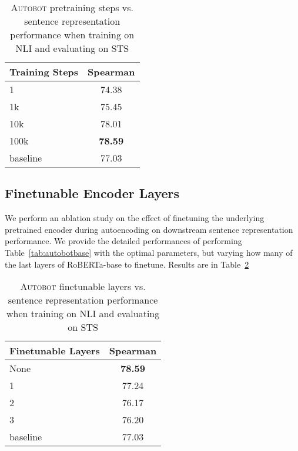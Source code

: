\begin{table}[ht!]
	\centering 
	\footnotesize
	\begin{tabular}{ l | c }
		\toprule
		\textbf{Training Steps} & \textbf{Spearman} \\ \midrule
		1 & 74.38 \\
		1k & 75.45 \\
		10k & 78.01 \\
		100k & \textbf{78.59}  \\
		\hline
		baseline & 77.03 \\
        \bottomrule
	\end{tabular}
	\caption{\label{tab:autosteps}\textsc{Autobot} pretraining steps vs. sentence representation performance when training on NLI and evaluating on STS}
	
\end{table}


\subsection{Finetunable Encoder Layers}\label{adx:finetune}
We perform an ablation study on the effect of finetuning the underlying pretrained encoder during autoencoding on downstream sentence representation performance. We provide the detailed performances of performing Table~\ref{tab:autobotbase} with the optimal parameters, but varying how many of the last layers of RoBERTa-base to finetune. Results are in Table~\ref{tab:finetune}

\begin{table}[ht!]
	\centering 
	\footnotesize

	\begin{tabular}{ l | c }
		\toprule
		\textbf{Finetunable Layers} & \textbf{Spearman} \\ \midrule
		None & \textbf{78.59} \\
		1 & 77.24 \\
		2 & 76.17 \\
		3 & 76.20 \\
		\hline
		baseline & 77.03 \\
        \bottomrule
	\end{tabular}
	\caption{\label{tab:finetune} \textsc{Autobot} finetunable layers vs. sentence representation performance when training on NLI and evaluating on STS}
	
\end{table} 



